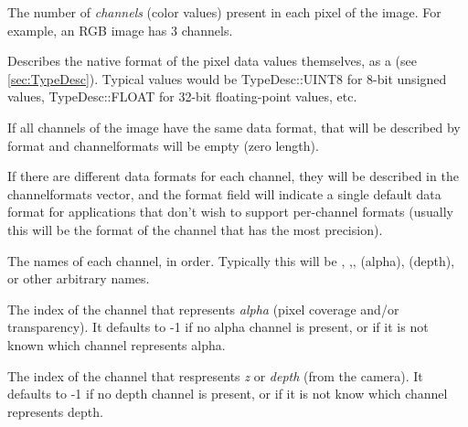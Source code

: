 The number of \emph{channels} (color values) present in each pixel of
the image.  For example, an RGB image has 3 channels.
\apiend

\newpage

Describes the native format of the pixel data values themselves, as a
\TypeDesc (see \ref{sec:TypeDesc}).  Typical values would be 
{\cf TypeDesc::UINT8} for 8-bit unsigned values, {\cf TypeDesc::FLOAT}
for 32-bit floating-point values, etc.

If all channels of the image have the same data format, that will
be described by {\cf format} and {\cf channelformats} will be empty
(zero length).

If there are different data formats for each channel, they will be
described in the {\cf channelformats} vector, and the {\cf format} field
will indicate a single default data format for applications that don't
wish to support per-channel formats (usually this will be the format
of the channel that has the most precision).
\apiend

The names of each channel, in order.  Typically this will be ,
,,  (alpha),  (depth), or other arbitrary
names.
\apiend

The index of the channel that represents \emph{alpha} (pixel coverage
and/or transparency).  It defaults to -1 if no alpha channel is present,
or if it is not known which channel represents alpha.
\apiend

The index of the channel that respresents \emph{z} or \emph{depth} (from
the camera).  It defaults to -1 if no depth channel is present, or if it
is not know which channel represents depth.
\apiend

